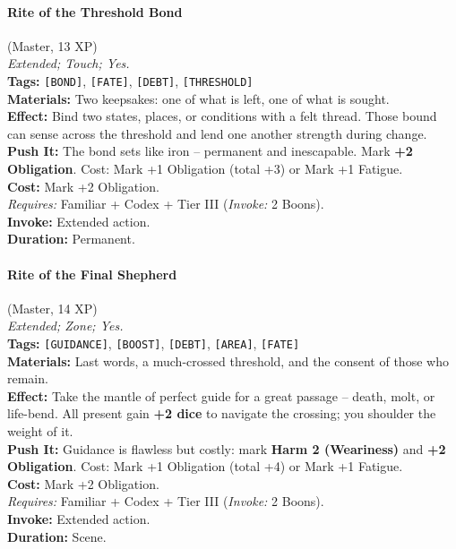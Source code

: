 \paragraph{Rite of the Threshold Bond} (Master, 13 XP) \hfill \\
\emph{Extended; Touch; Yes.} \\
\textbf{Tags:} \texttt{[BOND]}, \texttt{[FATE]}, \texttt{[DEBT]}, \texttt{[THRESHOLD]} \\
\textbf{Materials:} Two keepsakes: one of what is left, one of what is sought. \\
\textbf{Effect:} Bind two states, places, or conditions with a felt thread. Those bound can sense across the threshold and lend one another strength during change. \\
\textbf{Push It:} The bond sets like iron -- permanent and inescapable. Mark \textbf{+2 Obligation}. Cost: Mark +1 Obligation (total +3) or Mark +1 Fatigue. \\
\textbf{Cost:} Mark +2 Obligation. \\
\textit{Requires:} Familiar + Codex + Tier III (\textit{Invoke:} 2 Boons). \\
\textbf{Invoke:} Extended action. \\
\textbf{Duration:} Permanent.

\paragraph{Rite of the Final Shepherd} (Master, 14 XP) \hfill \\
\emph{Extended; Zone; Yes.} \\
\textbf{Tags:} \texttt{[GUIDANCE]}, \texttt{[BOOST]}, \texttt{[DEBT]}, \texttt{[AREA]}, \texttt{[FATE]} \\
\textbf{Materials:} Last words, a much-crossed threshold, and the consent of those who remain. \\
\textbf{Effect:} Take the mantle of perfect guide for a great passage -- death, molt, or life-bend. All present gain \textbf{+2 dice} to navigate the crossing; you shoulder the weight of it. \\
\textbf{Push It:} Guidance is flawless but costly: mark \textbf{Harm 2 (Weariness)} and \textbf{+2 Obligation}. Cost: Mark +1 Obligation (total +4) or Mark +1 Fatigue. \\
\textbf{Cost:} Mark +2 Obligation. \\
\textit{Requires:} Familiar + Codex + Tier III (\textit{Invoke:} 2 Boons). \\
\textbf{Invoke:} Extended action. \\
\textbf{Duration:} Scene.

